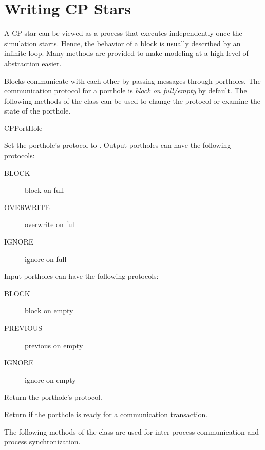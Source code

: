 \section{Writing CP Stars}
\label{Writing CP Stars}

A CP star can be viewed as a process that executes independently
once the simulation starts.  Hence, the behavior of a block is usually
described by an infinite loop.  Many methods are provided to make
modeling at a high level of abstraction easier.

Blocks communicate with each other by passing messages through
portholes.  The communication protocol for a porthole is \emph{block on
full/empty} by default.  The following methods of the 
class can be used to change the protocol or examine the state of the
porthole.

\begin{indexlist}{CPPortHole}

Set the porthole's protocol to .
Output portholes can have the following protocols:
\begin{description}
\item[BLOCK]  block on full
\item[OVERWRITE] overwrite on full
\item[IGNORE] ignore on full
\end{description}
Input portholes can have the following protocols:
\begin{description}
\item[BLOCK] block on empty
\item[PREVIOUS] previous on empty
\item[IGNORE] ignore on empty
\end{description}

Return the porthole's protocol.

Return  if the porthole is ready for a communication transaction.

\end{indexlist}

The following methods of the  class are used for inter-process
communication and process synchronization.

